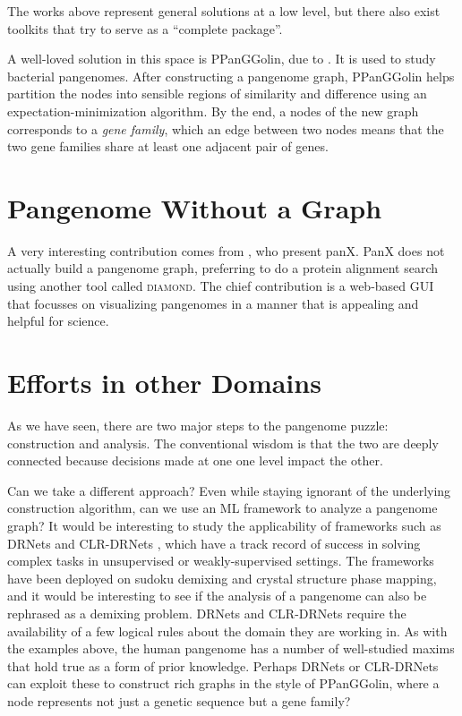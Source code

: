 \documentclass[acmsmall, screen]{acmart}
\begin{document}
The works above represent general solutions at a low level, but 
there also exist toolkits that try to serve as a ``complete package''.

A well-loved solution in this space is PPanGGolin, due to \citet{pangolin}.
It is used to study bacterial pangenomes. After constructing a pangenome
graph, PPanGGolin helps partition the nodes into sensible regions of similarity
and difference using an expectation-minimization algorithm.
By the end, a nodes of the new graph corresponds to a \emph{gene family},
which an edge between two nodes means that the two gene families 
share at least one adjacent pair of genes.

\section{Pangenome Without a Graph}

A very interesting contribution comes from \citet{panx}, who present panX.
PanX does not actually build a pangenome graph, preferring to do a 
protein alignment search using another tool called \textsc{diamond}.
The chief contribution is a web-based GUI that focusses on visualizing 
pangenomes in a manner that is appealing and helpful for science.

\section{Efforts in other Domains}

As we have seen, there are two major steps to the pangenome puzzle:
construction and analysis. The conventional wisdom is that the two are 
deeply connected because decisions made at one one level impact the other.

Can we take a different approach? 
Even while staying ignorant of the underlying construction algorithm, 
can we use an ML framework to analyze a pangenome graph?
It would be interesting to study the applicability of frameworks such as 
DRNets and CLR-DRNets \cite{drnets, clrdrnets}, 
which have a track record of success in 
solving complex tasks in unsupervised or weakly-supervised settings. 
The frameworks have been deployed on 
sudoku demixing and crystal structure phase mapping, and it would be 
interesting to see if the analysis of a pangenome can also be 
rephrased as a demixing problem. 
DRNets and CLR-DRNets require the availability of a few logical rules 
about the domain they are working in. As with the examples above, the human
pangenome has a number of well-studied maxims that hold true as 
a form of prior knowledge. Perhaps DRNets or CLR-DRNets can exploit these to 
construct rich graphs in the style of PPanGGolin, where a node 
represents not just a genetic sequence but a gene family?


\end{document}
